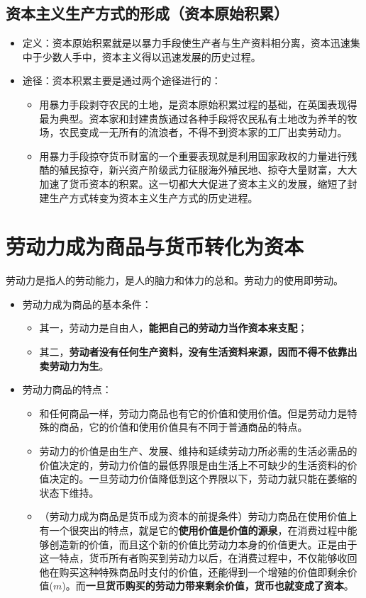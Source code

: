 \documentclass[12pt,openany]{ctexbook}
\begin{document}
\subsection{资本主义生产方式的形成（资本原始积累）}
\begin{itemize}
  \item 定义：资本原始积累就是以暴力手段使生产者与生产资料相分离，资本迅速集中于少数人手中，资本主义得以迅速发展的历史过程。
  \item 途径：资本积累主要是通过两个途径进行的：
\begin{itemize}
  \item 用暴力手段剥夺农民的土地，是资本原始积累过程的基础，在英国表现得最为典型。资本家和封建贵族通过各种手段将农民私有土地改为养羊的牧场，农民变成一无所有的流浪者，不得不到资本家的工厂出卖劳动力。
  \item 用暴力手段掠夺货币财富的一个重要表现就是利用国家政权的力量进行残酷的殖民掠夺，新兴资产阶级武力征服海外殖民地、掠夺大量财富，大大加速了货币资本的积累。这一切都大大促进了资本主义的发展，缩短了封建生产方式转变为资本主义生产方式的历史进程。
\end{itemize}
\end{itemize}
\section{劳动力成为商品与货币转化为资本}
\begin{mdquote}
劳动力是指人的劳动能力，是人的脑力和体力的总和。劳动力的使用即劳动。
\end{mdquote}
\begin{itemize}
  \item 劳动力成为商品的基本条件：
\begin{itemize}
  \item 其一，劳动力是自由人，\textbf{能把自己的劳动力当作资本来支配}；
  \item 其二，\textbf{劳动者没有任何生产资料，没有生活资料来源，因而不得不依靠出卖劳动力为生}。
\end{itemize}
  \item 劳动力商品的特点：
\begin{itemize}
  \item 和任何商品一样，劳动力商品也有它的价值和使用价值。但是劳动力是特殊的商品，它的价值和使用价值具有不同于普通商品的特点。
  \item 劳动力的价值是由生产、发展、维持和延续劳动力所必需的生活必需品的价值决定的，劳动力价值的最低界限是由生活上不可缺少的生活资料的价值决定的。一旦劳动力价值降低到这个界限以下，劳动力就只能在萎缩的状态下维持。
  \item （劳动力成为商品是货币成为资本的前提条件）劳动力商品在使用价值上有一个很突出的特点，就是它的\textbf{使用价值是价值的源泉}，在消费过程中能够创造新的价值，而且这个新的价值比劳动力本身的价值更大。正是由于这一特点，货币所有者购买到劳动力以后，在消费过程中，不仅能够收回他在购买这种特殊商品时支付的价值，还能得到一个增殖的价值即剩余价值($m$)。而\textbf{一旦货币购买的劳动力带来剩余价值，货币也就变成了资本}。
\end{itemize}
\end{itemize}
\end{document}
